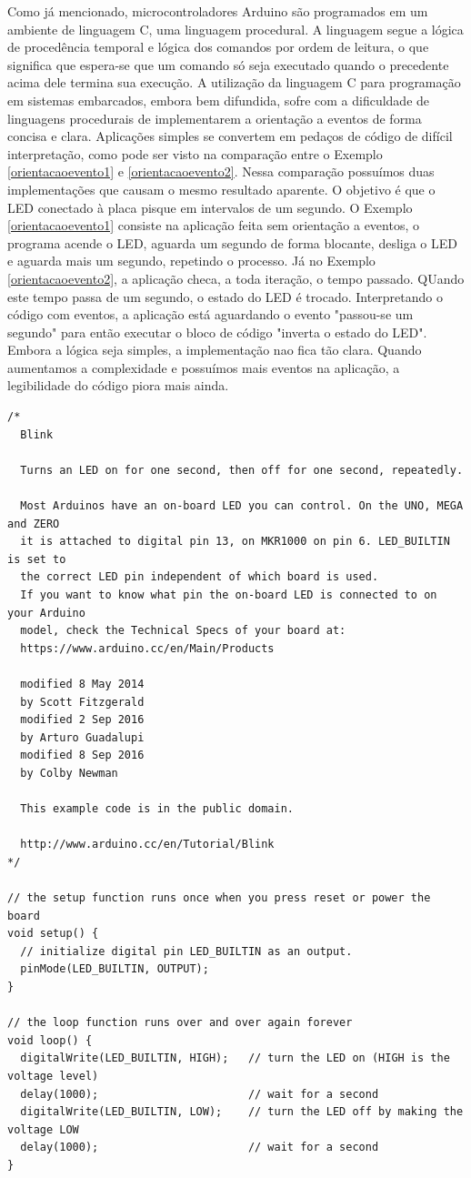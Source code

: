 \documentclass{article}
\begin{document}
\par Como já mencionado, microcontroladores Arduino são programados em um ambiente de linguagem C, uma linguagem procedural. A linguagem segue a lógica de procedência temporal e lógica dos comandos por ordem de leitura, o que significa que espera-se que um comando só seja executado quando o precedente acima dele termina sua execução. A utilização da linguagem C para programação em sistemas embarcados, embora bem difundida, sofre com a dificuldade de linguagens procedurais de implementarem a orientação a eventos de forma concisa e clara. Aplicações simples se convertem em pedaços de código de difícil interpretação, como pode ser visto na comparação entre o Exemplo \ref{orientacaoevento1} e \ref{orientacaoevento2}. Nessa comparação possuímos duas implementações que causam o mesmo resultado aparente. O objetivo é que o LED conectado à placa pisque em intervalos de um segundo. O Exemplo \ref{orientacaoevento1} consiste na aplicação feita sem orientação a eventos, o programa acende o LED, aguarda um segundo de forma blocante, desliga o LED e aguarda mais um segundo, repetindo o processo. Já no Exemplo \ref{orientacaoevento2}, a aplicação checa, a toda iteração, o tempo passado. QUando este tempo passa de um segundo, o estado do LED é trocado. Interpretando o código com eventos, a aplicação está aguardando o evento "passou-se um segundo" para então executar o bloco de código "inverta o estado do LED". Embora a lógica seja simples, a implementação nao fica tão clara. Quando aumentamos a complexidade e possuímos mais eventos na aplicação, a legibilidade do código piora mais ainda. 
\begin{lstlisting}[style=CStyle,label=orientacaoevento1,caption=Aplicação não orientada a evento]
/*
  Blink

  Turns an LED on for one second, then off for one second, repeatedly.

  Most Arduinos have an on-board LED you can control. On the UNO, MEGA and ZERO
  it is attached to digital pin 13, on MKR1000 on pin 6. LED_BUILTIN is set to
  the correct LED pin independent of which board is used.
  If you want to know what pin the on-board LED is connected to on your Arduino
  model, check the Technical Specs of your board at:
  https://www.arduino.cc/en/Main/Products

  modified 8 May 2014
  by Scott Fitzgerald
  modified 2 Sep 2016
  by Arturo Guadalupi
  modified 8 Sep 2016
  by Colby Newman

  This example code is in the public domain.

  http://www.arduino.cc/en/Tutorial/Blink
*/

// the setup function runs once when you press reset or power the board
void setup() {
  // initialize digital pin LED_BUILTIN as an output.
  pinMode(LED_BUILTIN, OUTPUT);
}

// the loop function runs over and over again forever
void loop() {
  digitalWrite(LED_BUILTIN, HIGH);   // turn the LED on (HIGH is the voltage level)
  delay(1000);                       // wait for a second
  digitalWrite(LED_BUILTIN, LOW);    // turn the LED off by making the voltage LOW
  delay(1000);                       // wait for a second
}
\end{lstlisting}
\end{document}
